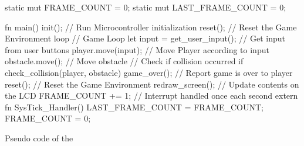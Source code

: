 \begin{listing}[ht]
  \begin{rustcode}
static mut FRAME_COUNT = 0;
static mut LAST_FRAME_COUNT = 0;

fn main() {
  init();  // Run Microcontroller initialization
  reset(); // Reset the Game Environment
  loop {   // Game Loop
    let input = get_user_input(); // Get input from user buttons
    player.move(input);           // Move Player according to input
    obstacle.move();              // Move obstacle
    // Check if collision occurred
    if check_collision(player, obstacle) {
      game_over(); // Report game is over to player
      reset();     // Reset the Game Environment
    }
    redraw_screen(); // Update contents on the LCD
    FRAME_COUNT += 1;
  }
}
// Interrupt handled once each second
extern fn SysTick_Handler() {
  LAST_FRAME_COUNT = FRAME_COUNT;
  FRAME_COUNT = 0;
}
  \end{rustcode}
  \caption{Pseudo code of the {\cg}}
  \label{lst:game_loop}
\end{listing}
